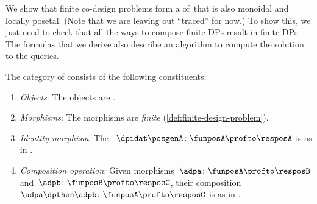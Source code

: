 We show that finite co-design problems form a  of~\DP that is also monoidal and locally posetal.
(Note that we are leaving out ``traced'' for now.) To show this, we just need to check that all the ways to compose finite DPs result in finite DPs.
The formulas that we derive also describe an algorithm to compute the solution to the queries.
\begin{definition}
    \label{def:DPfinite}
    The category of  \DPfinite consists of the following constituents:
    \begin{enumerate}
        \item \emph{Objects}: The objects are .
        \item \emph{Morphisms}: The morphisms are \emph{finite}  (\cref{def:finite-design-problem}).
        \item \emph{Identity morphism}: The ~$\dpidat\posgenA \colon \funposA \profto \resposA$ is as in \DP.
        \item \emph{Composition operation}: Given morphisms~$\adpa \colon  \funposA \profto \resposB$ and~$\adpb \colon \funposB \profto \resposC$, their composition~$\adpa \dpthen \adpb\colon \funposA\profto \resposC$ is as in \DP.
    \end{enumerate}
\end{definition}
